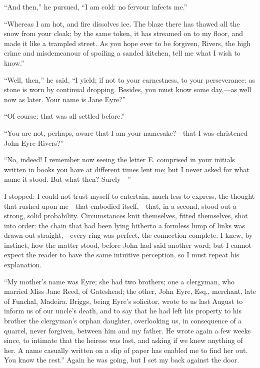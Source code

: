 \enquote{And then,} he pursued, \enquote{I am cold: no fervour infects
me.}

\enquote{Whereas I am hot, and fire dissolves ice. The blaze there has
thawed all the snow from your cloak; by the same token, it has streamed
on to my floor, and made it like a trampled street. As you hope ever to
be forgiven, \Mr{} Rivers, the high crime and misdemeanour of spoiling a
sanded kitchen, tell me what I wish to know.}

\enquote{Well, then,} he said, \enquote{I yield; if not to your
earnestness, to your perseverance: as stone is worn by continual
dropping. Besides, you must know some day,---as well now as later. 
Your name is Jane Eyre?}

\enquote{Of course: that was all settled before.}

\enquote{You are not, perhaps, aware that I am your namesake?---that I
was christened \St{} John Eyre Rivers?}

\enquote{No, indeed! I remember now seeing the letter E. comprised in
your initials written in books you have at different times lent me; but
I never asked for what name it stood. But what then? Surely---}

I stopped: I could not trust myself to entertain, much less to express,
the thought that rushed upon me---that embodied itself,---that, in a
second, stood out a strong, solid probability. Circumstances knit
themselves, fitted themselves, shot into order: the chain that had been
lying hitherto a formless lump of links was drawn out straight,---every
ring was perfect, the connection complete. I knew, by instinct, how the
matter stood, before \St{} John had said another word; but I cannot expect
the reader to have the same intuitive perception, so I must repeat his
explanation.

\enquote{My mother's name was Eyre; she had two brothers; one a
clergyman, who married Miss Jane Reed, of Gateshead; the other, John
Eyre, Esq., merchant, late of Funchal, Madeira. \Mr{} Briggs, being \Mr{}
Eyre's solicitor, wrote to us last August to inform us of our uncle's
death, and to say that he had left his property to his brother the
clergyman's orphan daughter, overlooking us, in consequence of a
quarrel, never forgiven, between him and my father. He wrote again a
few weeks since, to intimate that the heiress was lost, and asking if we
knew anything of her. A name casually written on a slip of paper has
enabled me to find her out. You know the rest.} Again he was going,
but I set my back against the door.

